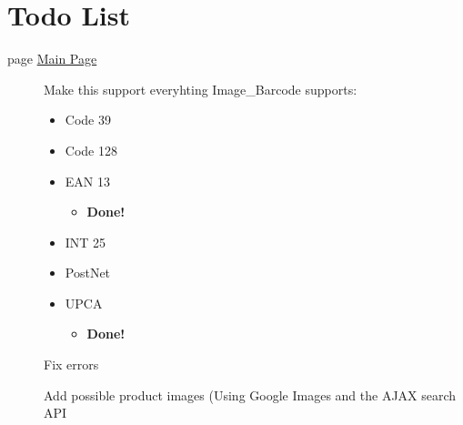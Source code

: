\hypertarget{todo}{}\section{Todo List}\label{todo}
\label{todo__todo000001}
\hypertarget{todo__todo000001}{}
 \begin{description}
\item[page \hyperlink{index}{Main Page} ]Make this support everyhting Image\_\-Barcode supports:\begin{itemize}
\item Code 39\item Code 128\item EAN 13\begin{itemize}
\item {\bf Done!} \end{itemize}
\item INT 25\item PostNet\item UPCA\begin{itemize}
\item {\bf Done!} \end{itemize}
\end{itemize}


Fix errors 

Add possible product images (Using Google Images and the AJAX search API

\end{description}
